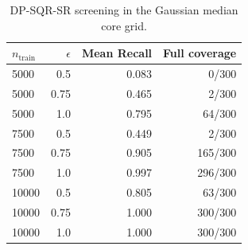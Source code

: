 \begin{table}[!htb]
\centering\small\journaltablestyle
\caption{DP-SQR-SR screening in the Gaussian median core grid.}
\label{tab:coverage-combined}
\begin{tabular}{@{}lrrr@{}}
\toprule
$n_{\mathrm{train}}$ & $\epsilon$ & Mean Recall & Full coverage\\
\midrule
5000 & 0.5 & 0.083 & 0/300\\
5000 & 0.75 & 0.465 & 2/300\\
5000 & 1.0 & 0.795 & 64/300\\
7500 & 0.5 & 0.449 & 2/300\\
7500 & 0.75 & 0.905 & 165/300\\
7500 & 1.0 & 0.997 & 296/300\\
10000 & 0.5 & 0.805 & 63/300\\
10000 & 0.75 & 1.000 & 300/300\\
10000 & 1.0 & 1.000 & 300/300\\
\bottomrule
\end{tabular}
\end{table}

